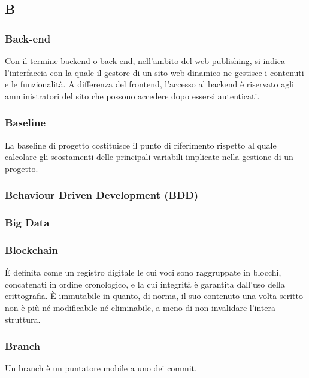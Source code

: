 \subsection*{\textbf{\hfill \Huge{B} \hfill}} 
\subsubsection*{Back-end}
Con il termine backend o back-end, nell'ambito del web-publishing, si indica l'interfaccia con la quale il gestore di un sito web dinamico ne gestisce i contenuti e le funzionalità. A differenza del frontend, l'accesso al backend è riservato agli amministratori del sito che possono accedere dopo essersi autenticati.
\subsubsection*{Baseline}
La baseline di progetto costituisce il punto di riferimento rispetto al quale calcolare gli scostamenti delle principali variabili implicate nella gestione di un progetto.
\subsubsection*{Behaviour Driven Development (BDD)}

\subsubsection*{Big Data}

\subsubsection*{Blockchain}
È definita come un registro digitale le cui voci sono raggruppate in blocchi, concatenati in ordine cronologico, e la cui integrità è garantita dall’uso della crittografia. È immutabile in quanto, di norma, il suo contenuto una volta scritto non è più né modificabile né eliminabile, a meno di non invalidare l’intera struttura.
\subsubsection*{Branch}
Un branch è un puntatore mobile a uno dei commit.
